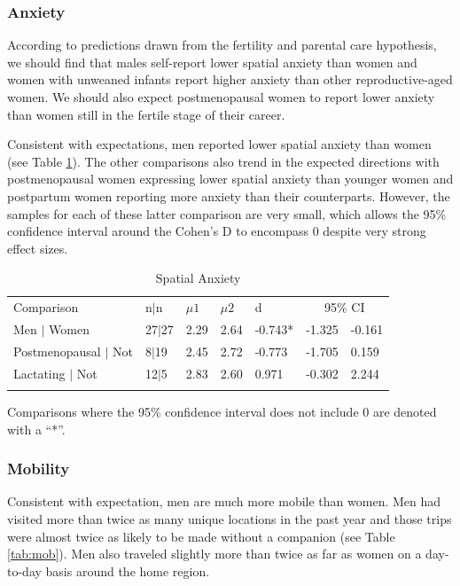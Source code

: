 		\subsubsection{Anxiety}
		\label{sec:3.1.2}
According to predictions drawn from the fertility and parental care hypothesis, we should find that males self-report lower spatial anxiety than women and women with unweaned infants report higher anxiety than other reproductive-aged women.  We should also expect postmenopausal women to report lower anxiety than women still in the fertile stage of their career.

Consistent with expectations, men reported lower spatial anxiety than women (see Table \ref{tab:anx}).  The other comparisons also trend in the expected directions with postmenopausal women expressing lower spatial anxiety than younger women and postpartum women reporting more anxiety than their counterparts.  However, the samples for each of these latter comparison are very small, which allows the 95\% confidence interval around the Cohen's D to encompass 0 despite very strong effect sizes.

\begin{table}[h!]
\caption{Spatial Anxiety}
\label{tab:anx}  
\begin{tabular}{lllllll}
\hline\noalign{\smallskip}
Comparison & \phantom{0}n$|$n & $\mu1$ & $\mu2$ & d & \multicolumn{2}{c}{95\% CI} \\
\noalign{\smallskip}\hline\noalign{\smallskip}
Men $|$ Women & 27$|$27 & 2.29 & 2.64 & -0.743* & -1.325 & -0.161 \\
Postmenopausal $|$ Not & \phantom{0}8$|$19 & 2.45 & 2.72  & -0.773 & -1.705 & \phantom{-}0.159\\
Lactating $|$ Not & 12$|$5 & 2.83 & 2.60 & \phantom{-}0.971 & -0.302 & \phantom{-}2.244 \\
\noalign{\smallskip}\hline
\end{tabular}\par
\bigskip
Comparisons where the 95\% confidence interval does not include 0 are denoted with a ``*''.
\end{table}		 

		\subsubsection{Mobility}
		\label{sec:3.1.2}
Consistent with expectation, men are much more mobile than women.  Men had visited more than twice as many unique locations in the past year and those trips were almost twice as likely to be made without a companion (see Table \ref{tab:mob}).  Men also traveled slightly more than twice as far as women on a day-to-day basis around the home region.  

